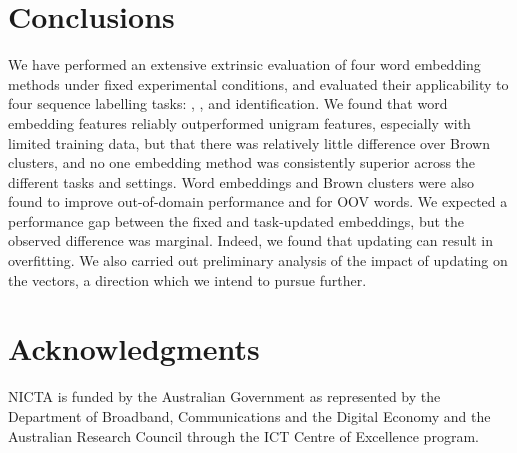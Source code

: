 \section{Conclusions}

We have performed an extensive extrinsic evaluation of four word embedding methods
under fixed experimental conditions, and evaluated their applicability to four sequence labelling tasks: \pos, \chunking, \ner and \mwe identification.
We found that word embedding features reliably outperformed unigram
features, especially with limited training data, but that there was
relatively little difference over Brown clusters, and
no one embedding method was consistently superior across the different tasks and settings.
Word embeddings and Brown clusters were also found to improve
out-of-domain performance and for OOV words.
We expected a performance gap between the fixed and task-updated embeddings, but the observed difference was marginal.
Indeed, we found that updating can result in overfitting.
We also carried out preliminary analysis of the impact of updating on
the vectors, a direction which we intend to pursue further.



\section{Acknowledgments}
NICTA is funded by the Australian Government as represented by the Department of Broadband, Communications and the Digital Economy and the Australian Research Council through the ICT Centre of Excellence program.

